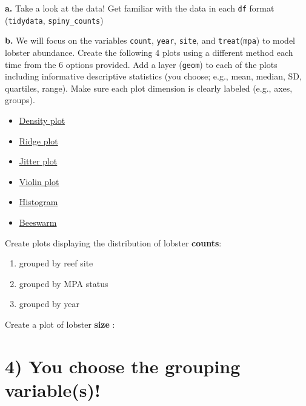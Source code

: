 \documentclass[
]{article}
\providecommand{\tightlist}{%
  \setlength{\itemsep}{0pt}\setlength{\parskip}{0pt}}
\begin{document}
\textbf{a.} Take a look at the data! Get familiar with the data in each
\texttt{df} format (\texttt{tidydata}, \texttt{spiny\_counts})

\textbf{b.} We will focus on the variables \texttt{count},
\texttt{year}, \texttt{site}, and \texttt{treat}(\texttt{mpa}) to model
lobster abundance. Create the following 4 plots using a different method
each time from the 6 options provided. Add a layer (\texttt{geom}) to
each of the plots including informative descriptive statistics (you
choose; e.g., mean, median, SD, quartiles, range). Make sure each plot
dimension is clearly labeled (e.g., axes, groups).

\begin{itemize}
\tightlist
\item
  \href{https://r-charts.com/distribution/density-plot-group-ggplot2}{Density
  plot}
\item
  \href{https://r-charts.com/distribution/ggridges/}{Ridge plot}
\item
  \href{https://ggplot2.tidyverse.org/reference/geom_jitter.html}{Jitter
  plot}
\item
  \href{https://r-charts.com/distribution/violin-plot-group-ggplot2}{Violin
  plot}
\item
  \href{https://r-charts.com/distribution/histogram-density-ggplot2/}{Histogram}
\item
  \href{https://r-charts.com/distribution/beeswarm/}{Beeswarm}
\end{itemize}

Create plots displaying the distribution of lobster \textbf{counts}:

\begin{enumerate}
\def\labelenumi{\arabic{enumi})}
\tightlist
\item
  grouped by reef site\\
\item
  grouped by MPA status
\item
  grouped by year
\end{enumerate}

Create a plot of lobster \textbf{size} :

\section{4) You choose the grouping
variable(s)!}\label{you-choose-the-grouping-variables}
\end{document}
